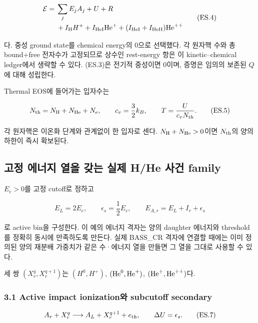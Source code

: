 \documentclass[11pt,a4paper]{article}
\begin{document}
\[
\begin{aligned}
{\cal E}
={}&\sum_j E_j A_j+U+R\\
 &+I_{\rm H}H^+
 +I_{\rm HeI}{\rm He}^+
 +(I_{\rm HeI}+I_{\rm HeII}){\rm He}^{++}
\end{aligned}
\tag{ES.4}
\]

다. 중성 ground state를 chemical energy의 0으로 선택했다. 각 원자핵 수와 총 bound+free 전자수가 고정되므로 상수인 rest-energy 항은 이 kinetic--chemical ledger에서 생략할 수 있다. (ES.3)은 전기적 중성이면 0이며, 증명은 임의의 보존된 \(Q\)에 대해 성립한다.

Thermal EOS에 들어가는 입자수는

\[
N_{\rm th}=N_{\rm H}+N_{\rm He}+N_e,\qquad
c_v=\frac32 k_B,\qquad T=\frac{U}{c_vN_{\rm th}}.
\tag{ES.5}
\]

각 원자핵은 이온화 단계와 관계없이 한 입자로 센다. \(N_{\rm H}+N_{\rm He}>0\)이면 \(N_{\rm th}\)의 양의 하한이 즉시 확보된다.

\hypertarget{uxace0uxc815-uxc5d0uxb108uxc9c0-uxc5f4uxc744-uxac16uxb294-uxc2e4uxc81c-hhe-uxc0acuxac74-family}{%
\subsection{고정 에너지 열을 갖는 실제 H/He 사건 family}\label{uxace0uxc815-uxc5d0uxb108uxc9c0-uxc5f4uxc744-uxac16uxb294-uxc2e4uxc81c-hhe-uxc0acuxac74-family}}

\(E_c>0\)를 고정 cutoff로 정하고

\[
E_L=2E_c,\qquad \epsilon_s=\frac12E_c,\qquad
E_{A,r}=E_L+I_r+\epsilon_s
\tag{ES.6}
\]

로 active bin을 구성한다. 이 예의 에너지 격자는 양의 daughter 에너지와 threshold를 정확히 동시에 만족하도록 만든다. 실제 BASS\_CR 격자에 연결할 때에는 이미 정의된 양의 재분배 가중치가 같은 수·에너지 열을 만들면 그 열을 그대로 사용할 수 있다.

세 쌍 \((X_r^q,X_r^{q+1})\)는 \((H^0,H^+)\), \(({\rm He}^0,{\rm He}^+)\), \(({\rm He}^+,{\rm He}^{++})\)다.

\hypertarget{active-impact-ionizationuxc640-subcutoff-secondary}{%
\subsubsection{3.1 Active impact ionization와 subcutoff secondary}\label{active-impact-ionizationuxc640-subcutoff-secondary}}

\[
A_r+X_r^q\longrightarrow A_L+X_r^{q+1}+e_{\rm th},
\qquad \Delta U=\epsilon_s.
\tag{ES.7}
\]
\end{document}
